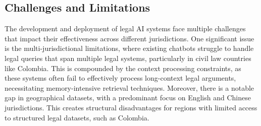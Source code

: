 \subsection{Challenges and Limitations}
%    
%    
%    
%    
%    
%    
The development and deployment of legal AI systems face multiple challenges that impact their 
effectiveness across different jurisdictions. One significant issue is the multi-jurisdictional limitations, 
where existing chatbots struggle to handle legal queries that span multiple legal systems, particularly in civil 
law countries like Colombia. This is compounded by the context processing constraints, as these systems often fail to 
effectively process long-context legal arguments, necessitating memory-intensive retrieval techniques.
Moreover, there is a notable gap in geographical datasets, with a predominant focus on English and Chinese jurisdictions. 
This creates structural disadvantages for regions with limited access to structured legal datasets, such as Colombia. 

